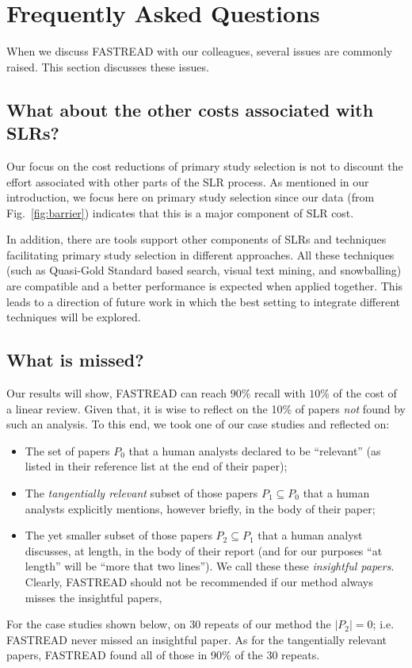 \documentclass{svjour3}
\theoremstyle{break}
\begin{document}
\section{Frequently Asked Questions}
\label{sect: Frequently Asked Questions}

When we discuss FASTREAD with our colleagues, several issues are commonly raised. This section discusses these issues.

\subsection{What about the other costs associated with SLRs?}

Our focus on the cost reductions of primary study selection is not to discount the effort associated with other parts of the SLR process. As mentioned in our introduction, we focus here on primary study selection since our data (from Fig.~\ref{fig:barrier}) indicates that this is a major component of SLR cost. 

In addition, there are tools support other components of SLRs and techniques facilitating primary study selection in different approaches. All these techniques (such as  Quasi-Gold Standard based search, visual text mining, and snowballing) are compatible and a better performance is expected when applied together. This leads to a direction of future work in which the best setting to integrate different techniques will be explored.

\subsection{What is missed?}

Our results will show, FASTREAD can reach $90\%$ recall with $10\%$ of the cost of a linear review. Given that, it is wise to reflect
on the 10\% of papers {\em not} found by such an analysis. To this end, we took one of our case studies and reflected on:
\begin{itemize}
\item The set of papers $P_0$ that a human analysts declared to be ``relevant'' (as listed in their reference list at the end of their paper);
\item The {\em tangentially relevant} subset of those  papers $P_1 \subseteq P_0$ that a human analysts explicitly mentions, however briefly, in the body of their paper;
\item The yet smaller subset of those papers $P_2 \subseteq P_1$  that a human analyst discusses, at length, in the body of their report (and for
our purposes ``at length'' will be ``more that two lines''). We call these these {\em insightful papers}. Clearly, FASTREAD should not be recommended if our method always misses the insightful papers, 
\end{itemize}
For the case studies shown below, on 30 repeats of our method the $|P_2|=0$; i.e. FASTREAD never missed an insightful paper. As for the tangentially
relevant papers, FASTREAD found all of those in 90\% of the 30 repeats. 
\end{document}
